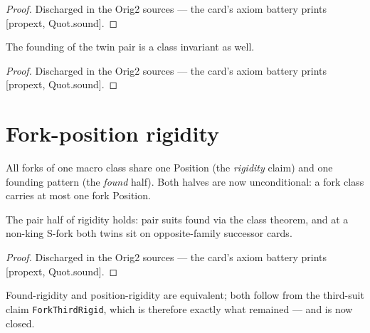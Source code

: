 \begin{proof}
\leanok
Discharged in the Orig2 sources --- the card's axiom battery prints [propext, Quot.sound].
\end{proof}

\begin{theorem}\label{thm:twinPair}
\leanok
{}
The founding of the twin pair is a class invariant as well.
\end{theorem}

\begin{proof}
\leanok
Discharged in the Orig2 sources --- the card's axiom battery prints [propext, Quot.sound].
\end{proof}

\section{Fork-position rigidity}

\begin{definition}\label{def:forkPosition}
\leanok
{}
All forks of one macro class share one Position (the
\emph{rigidity} claim) and one founding pattern (the \emph{found}
half).  Both halves are now unconditional: a fork class carries
at most one fork Position.
\end{definition}

\begin{theorem}\label{thm:forkPairClass}
\leanok
{}
The pair half of rigidity holds: pair suits found via the class
theorem, and at a non-king S-fork both twins sit on
opposite-family successor cards.
\end{theorem}

\begin{proof}
\leanok
Discharged in the Orig2 sources --- the card's axiom battery prints [propext, Quot.sound].
\end{proof}

\begin{theorem}\label{thm:rigidReduce}
\leanok
{}
Found-rigidity and position-rigidity are equivalent; both follow
from the third-suit claim \texttt{ForkThirdRigid}, which is
therefore exactly what remained --- and is now closed.
\end{theorem}

